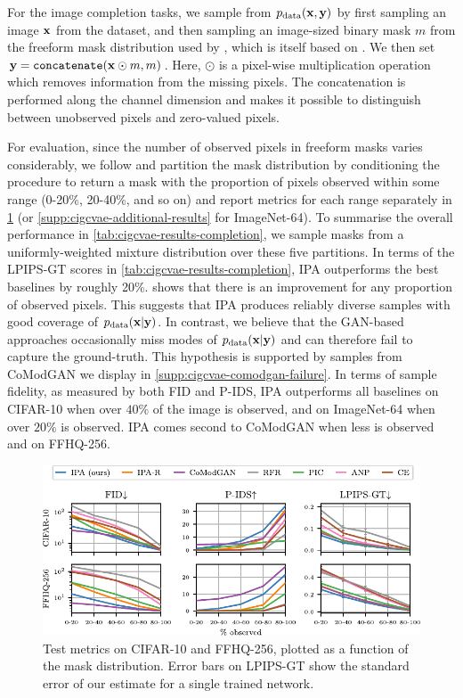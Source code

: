 For the image completion tasks, we sample from $p_{\rm{data}}({\mathbf{x}}, {\mathbf{y}})$ by
first sampling an image ${\mathbf{x}}$ from the dataset, and then sampling an
image-sized binary mask $m$ from the freeform mask distribution used by
\citet{zhao2021large}, which is itself based on \citet{yu2018generative}. We
then set ${\mathbf{y}} = \texttt{concatenate}({\mathbf{x}} \odot m, m)$. Here, $\odot$ is a
pixel-wise multiplication operation which removes information from the missing
pixels. The concatenation is performed along the channel dimension and makes it
possible to distinguish between unobserved pixels and zero-valued pixels.

For evaluation, since the number of observed pixels in freeform masks varies
considerably, we follow \citet{zhao2021large} and partition the mask
distribution by conditioning the procedure to return a mask with the proportion
of pixels observed within some range (0-20\%, 20-40\%, and so on) and report
metrics for each range separately in \cref{fig:cigcvae-metrics} (or
\cref{supp:cigcvae-additional-results} for ImageNet-64). To summarise the
overall performance in \cref{tab:cigcvae-results-completion}, we sample masks from a
uniformly-weighted mixture distribution over these five partitions. In terms of
the LPIPS-GT scores in \cref{tab:cigcvae-results-completion}, IPA outperforms the best
baselines by roughly 20\%.  shows that there is an improvement
for any proportion of observed pixels. This suggests that IPA produces reliably
diverse samples with good coverage of $p_{\rm{data}}({\mathbf{x}}|{\mathbf{y}})$. In contrast, we
believe that the GAN-based approaches occasionally miss modes of
$p_{\rm{data}}({\mathbf{x}}|{\mathbf{y}})$ and can therefore fail to capture the ground-truth.
This hypothesis is supported by samples from CoModGAN we display in
\cref{supp:cigcvae-comodgan-failure}. In terms of sample fidelity, as measured by both
FID and P-IDS, IPA outperforms all baselines on CIFAR-10 when over $40\%$ of the
image is observed, and on ImageNet-64 when over $20\%$ is observed. IPA comes
second to CoModGAN when less is observed and on FFHQ-256.

\begin{figure}[t]
  \centering
  \includegraphics[width=\textwidth]{figs/cigcvae/metrics}
  \caption{Test metrics on CIFAR-10 and FFHQ-256, plotted as a function of
    the mask distribution. Error bars on LPIPS-GT show the standard error of our
    estimate for a single trained network.}
  \label{fig:cigcvae-metrics}
  \vspace{-.5cm}
\end{figure}


